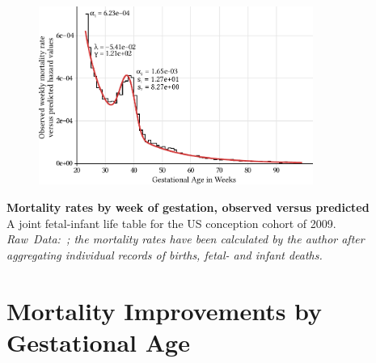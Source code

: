 \documentclass{beamer}
\begin{document}
\begin{frame}
\frametitle{\insertsection}

\begin{figure}[htb!]
\includegraphics[width = 0.8\textwidth]{./fig/us_fimort_2009_mx_predobs.pdf}\\
\end{figure}

\footnotesize\textbf{Mortality rates by week of gestation, observed versus predicted}\\
A joint fetal-infant life table for the US conception cohort of 2009.\\
\scriptsize\emph{Raw~Data:~\textcite{DVS2015}; the mortality rates have been calculated by the author after aggregating individual records of births, fetal- and infant deaths.}

\end{frame}

\section{Mortality Improvements by Gestational Age} %
\end{document}
